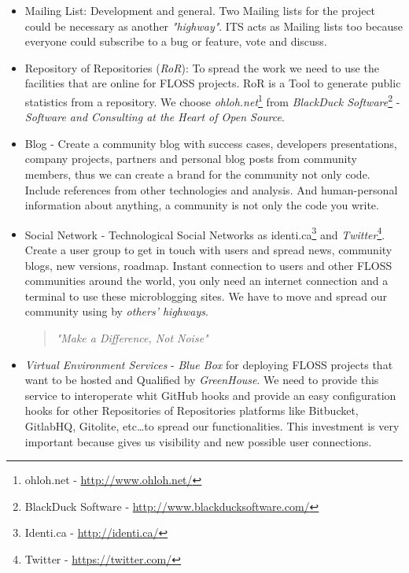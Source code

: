 \documentclass[11pt]{scrartcl}
\begin{document}
\begin{itemize}
	\item Mailing List: Development and general. Two Mailing lists for the project could be necessary as another \emph{"highway"}. ITS acts as Mailing lists too because everyone could subscribe to a bug or feature, vote and discuss. %
	\item Repository of Repositories (\emph{RoR}): To spread the work we need to use the facilities that are online for FLOSS projects. RoR is a Tool to generate public statistics from a repository. We choose \emph{ohloh.net}\footnote{ohloh.net - \url{http://www.ohloh.net/}} from \emph{BlackDuck Software}\footnote{BlackDuck Software - \url{http://www.blackducksoftware.com/}} - \emph{Software and Consulting at the Heart of Open Source}. %
	 \item Blog - Create a community blog with success cases, developers presentations, company projects, partners and personal blog posts from community members, thus we can create a brand for the community not only code. Include references from other technologies and analysis. And human-personal information about anything, a community is not only the code you write. %
	 \item Social Network - Technological Social Networks as identi.ca\footnote{Identi.ca - \url{http://identi.ca/}} and \emph{Twitter}\footnote{Twitter - \url{https://twitter.com/}}. Create a user group to get in touch with users and spread news, community blogs, new versions, roadmap. Instant connection to users and other FLOSS communities around the world, you only need an internet connection and a terminal to use these microblogging sites. We have to move and spread our community using by \emph{others' highways}.
	 \begin{quotation}
	    \begin{center}
	    \emph{"Make a Difference, Not Noise"}
	    \end{center}
	 \end{quotation}
    \item \emph{Virtual Environment Services} - \emph{Blue Box} for deploying FLOSS projects that want to be hosted and Qualified by \emph{GreenHouse}. We need to provide this service to interoperate whit GitHub hooks and provide an easy configuration hooks for other Repositories of Repositories platforms like Bitbucket, GitlabHQ, Gitolite, etc\ldots to spread our functionalities. This investment is very important because gives us visibility and new possible user connections.
\end{itemize}
\end{document}
